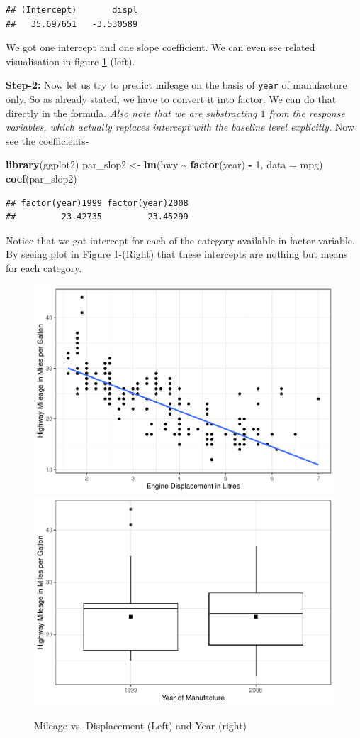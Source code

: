 \documentclass[
]{book}
\newenvironment{Shaded}{\begin{snugshade}}{\end{snugshade}}
\newcommand{\AttributeTok}[1]{\textcolor[rgb]{0.13,0.29,0.53}{#1}}
\newcommand{\DecValTok}[1]{\textcolor[rgb]{0.00,0.00,0.81}{#1}}
\newcommand{\FunctionTok}[1]{\textcolor[rgb]{0.13,0.29,0.53}{\textbf{#1}}}
\newcommand{\NormalTok}[1]{#1}
\newcommand{\OtherTok}[1]{\textcolor[rgb]{0.56,0.35,0.01}{#1}}
\newcommand{\SpecialCharTok}[1]{\textcolor[rgb]{0.81,0.36,0.00}{\textbf{#1}}}
\begin{document}
\begin{verbatim}
## (Intercept)       displ 
##   35.697651   -3.530589
\end{verbatim}

We got one intercept and one slope coefficient. We can even see related visualisation in figure \ref{fig:parrslop} (left).

\textbf{Step-2:} Now let us try to predict mileage on the basis of \texttt{year} of manufacture only. So as already stated, we have to convert it into factor. We can do that directly in the formula. \emph{Also note that we are substracting \(1\) from the response variables, which actually replaces intercept with the baseline level explicitly.} Now see the coefficients-

\begin{Shaded}
\begin{Highlighting}[]
\FunctionTok{library}\NormalTok{(ggplot2)}
\NormalTok{par\_slop2 }\OtherTok{\textless{}{-}} \FunctionTok{lm}\NormalTok{(hwy }\SpecialCharTok{\textasciitilde{}} \FunctionTok{factor}\NormalTok{(year) }\SpecialCharTok{{-}} \DecValTok{1}\NormalTok{, }\AttributeTok{data =}\NormalTok{ mpg)}
\FunctionTok{coef}\NormalTok{(par\_slop2)}
\end{Highlighting}
\end{Shaded}

\begin{verbatim}
## factor(year)1999 factor(year)2008 
##         23.42735         23.45299
\end{verbatim}

Notice that we got intercept for each of the category available in factor variable. By seeing plot in Figure \ref{fig:parrslop}-(Right) that these intercepts are nothing but means for each category.

\begin{figure}

{\centering \includegraphics[width=0.47\linewidth]{DauR_files/figure-latex/parrslop-1} \includegraphics[width=0.47\linewidth]{DauR_files/figure-latex/parrslop-2} 

}

\caption{Mileage vs. Displacement (Left) and Year (right)}\label{fig:parrslop}
\end{figure}
\end{document}
